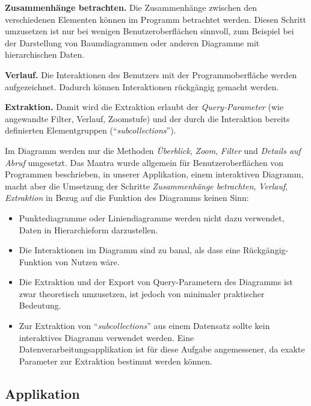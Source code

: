 \textbf{Zusammenhänge betrachten.} Die Zusammenhänge zwischen den verschiedenen Elementen können im Programm betrachtet werden. Diesen Schritt umzusetzen ist nur bei wenigen Benutzeroberflächen sinnvoll, zum Beispiel bei der Darstellung von Baumdiagrammen oder anderen Diagramme mit hierarchischen Daten.

\textbf{Verlauf.} Die Interaktionen des Benutzers mit der Programmoberfläche werden aufgezeichnet. Dadurch können Interaktionen rückgängig gemacht werden.

\textbf{Extraktion.} Damit wird die Extraktion erlaubt der \textit{Query-Parameter} (wie angewandte Filter, Verlauf, Zoomstufe) und der durch die Interaktion bereits definierten Elementgruppen ("`\textit{subcollections}"').

Im Diagramm werden nur die Methoden \textit{Überblick}, \textit{Zoom}, \textit{Filter} und \textit{Details auf Abruf} umgesetzt. Das Mantra wurde allgemein für Benutzeroberflächen von Programmen beschrieben, in unserer Applikation, einem interaktiven Diagramm, macht aber die Umsetzung der Schritte \textit{Zusammenhänge betrachten}, \textit{Verlauf}, \textit{Extraktion} in Bezug auf die Funktion des Diagramms keinen Sinn:

\begin{itemize}
	\item Punktediagramme oder Liniendiagramme werden nicht dazu verwendet, Daten in Hierarchieform darzustellen.
	\item Die Interaktionen im Diagramm sind zu banal, als dass eine Rückgängig-Funktion von Nutzen wäre.
	\item Die Extraktion und der Export von Query-Parametern des Diagramms ist zwar theoretisch umzusetzen, ist jedoch von minimaler praktischer Bedeutung.
	\item Zur Extraktion von "`\textit{subcollections}"' aus einem Datensatz sollte kein interaktives Diagramm verwendet werden. Eine Datenverarbeitungsapplikation ist für diese Aufgabe angemessener, da exakte Parameter zur Extraktion bestimmt werden können.
\end{itemize}

\newpage

\subsection{Applikation}

